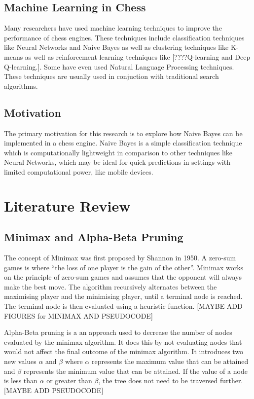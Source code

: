 \documentclass{article}
\begin{document}
\subsection{Machine Learning in Chess}
\label{sec:ml}
Many researchers have used machine learning techniques to improve the performance of chess engines.
These techniques include classification techniques like Neural Networks and Naive Bayes as well as clustering techniques
like K-means as well as reinforcement learning techniques like [????Q-learning and Deep Q-learning.]. Some 
have even used Natural Language Processing techniques.\cite{NLPinChess} These techniques are usually 
used in conjuction with traditional search algorithms.

\subsection{Motivation}
\label{sec:motivation}
The primary motivation for this research is to explore how Naive Bayes can be implemented 
in a chess engine. Naive Bayes is a simple classification technique which is computationally 
lightweight in comparison to other techniques like Neural Networks, which may be ideal for 
quick predictions in settings with limited computational power, like mobile devices.


\section{Literature Review}
\label{sec:literature}

\subsection{Minimax and Alpha-Beta Pruning}
\label{sec:minimax}
The concept of Minimax was first proposed by Shannon in 1950\cite{xieResearchImprovementAlphaBeta2022}.
A zero-sum games is where ``the loss of one player is the gain of the other''\cite{plaatResearchReSearch2024}.
Minimax works on the principle of zero-sum games and assumes that the opponent will always make the 
best move. The algorithm recursively alternates between the maximising player and the minimising player,
until a terminal node is reached. The terminal node is then evaluated using a heuristic function. [MAYBE ADD FIGURES for
MINIMAX AND PSEUDOCODE]

Alpha-Beta pruning is a an approach used to decrease the number of nodes evaluated by the minimax algorithm.
It does this by not evaluating nodes that would not affect the final outcome of the minimax algorithm.
It introduces two new values $\alpha$ and $\beta$ where $\alpha$ represents the maximum value
that can be attained and $\beta$ represents the minimum value that can be attained. If the 
value of a node is less than $\alpha$ or greater than $\beta$, the tree does not need to be
traversed further. [MAYBE ADD PSEUDOCODE]
\end{document}
